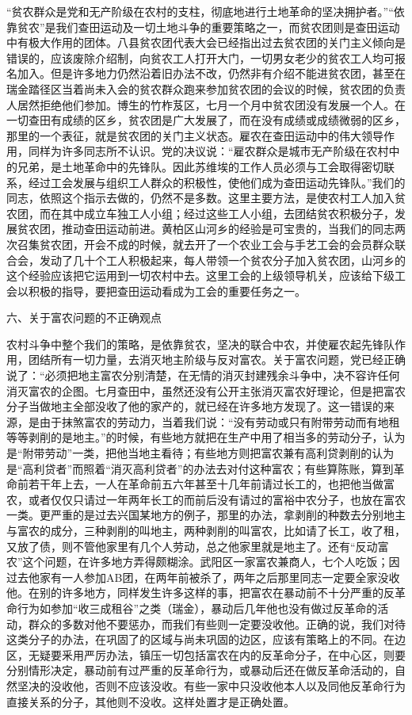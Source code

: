 “贫农群众是党和无产阶级在农村的支柱，彻底地进行土地革命的坚决拥护者。”“依靠贫农”是我们查田运动及一切土地斗争的重要策略之一，而贫农团则是查田运动中有极大作用的团体。八县贫农团代表大会已经指出过去贫农团的关门主义倾向是错误的，应该废除介绍制，向贫农工人打开大门，一切男女老少的贫农工人均可报名加入。但是许多地力仍然沿着旧办法不改，仍然非有介绍不能进贫农团，甚至在瑞金踏径区当着尚未入会的贫农群众跑来参加贫农团的会议的时候，贫农团的负责人居然拒绝他们参加。博生的竹柞芨区，七月一个月中贫农团没有发展一个人。在一切查田有成绩的区乡，贫农团是广大发展了，而在没有成绩或成绩微弱的区乡，那里的一个表征，就是贫农团的关门主义状态。雇农在查田运动中的伟大领导作用，同样为许多同志所不认识。党的决议说：“雇农群众是城市无产阶级在农村中的兄弟，是土地革命中的先锋队。因此苏维埃的工作人员必须与工会取得密切联系，经过工会发展与组织工人群众的积极性，使他们成为查田运动先锋队。”我们的同志，依照这个指示去做的，仍然不是多数。这里主要方法，是使农村工人加入贫农团，而在其中成立车独工人小组；经过这些工人小组，去团结贫农积极分子，发展贫农团，推动查田运动前进。黄柏区山河乡的经验是可宝贵的，当我们的同志两次召集贫农团，开会不成的时候，就去开了一个农业工会与手艺工会的会员群众联合会，发动了几十个工人积极起来，每人带领一个贫农分子加入贫农团，山河乡的这个经验应该把它运用到一切农村中去。这里工会的上级领导机关，应该给下级工会以积极的指导，要把查田运动看成为工会的重要任务之一。

六、关于富农问题的不正确观点

农村斗争中整个我们的策略，是依靠贫农，坚决的联合中农，并使雇农起先锋队作用，团结所有一切力量，去消灭地主阶级与反对富农。关于富农问题，党已经正确说了：“必须把地主富农分别清楚，在无情的消灭封建残余斗争中，决不容许任何消灭富农的企图。七月查田中，虽然还没有公开主张消灭富农好理论，但是把富农分子当做地主全部没收了他的家产的，就已经在许多地方发现了。这一错误的来源，是由于抹煞富农的劳动力，当着我们说：“没有劳动或只有附带劳动而有地租等等剥削的是地主。”的时候，有些地方就把在生产中用了相当多的劳动分子，认为是“附带劳动”一类，把他当地主看待；有些地方则把富农兼有高利贷剥削的认为是“高利贷者”而照着“消灭高利贷者”的办法去对付这种富农；有些算陈账，算到革命前若干年上去，一人在革命前五六年甚至十几年前请过长工的，也把他当做富农，或者仅仅只请过一年两年长工的而前后没有请过的富裕中农分子，也放在富农一类。更严重的是过去兴国某地方的例子，那里的办法，拿剥削的种数去分别地主与富农的成分，三种剥削的叫地主，两种剥削的叫富农，比如请了长工，收了租，又放了债，则不管他家里有几个人劳动，总之他家里就是地主了。还有“反动富农”这个问题，在许多地方弄得颇糊涂。武阳区一家富农兼商人，七个人吃饭；因过去他家有一人参加AB团，在两年前被杀了，两年之后那里同志一定要全家没收他。在别的许多地方，同样发生许多这样的事，把富农在暴动前不十分严重的反革命行为如参加“收三成租谷”之类（瑞金），暴动后几年他也没有做过反革命的活动，群众的多数对他不要惩办，而我们有些则一定要没收他。正确的说，我们对待这类分子的办法，在巩固了的区域与尚未巩固的边区，应该有策略上的不同。在边区，无疑要釆用严厉办法，镇压一切包括富农在内的反革命分子，在中心区，则要分别情形决定，暴动前有过严重的反革命行为，或暴动后还在做反革命活动的，自然坚决的没收他，否则不应该没收。有些一家中只没收他本人以及同他反革命行为直接关系的分子，其他则不没收。这样处置才是正确处置。

